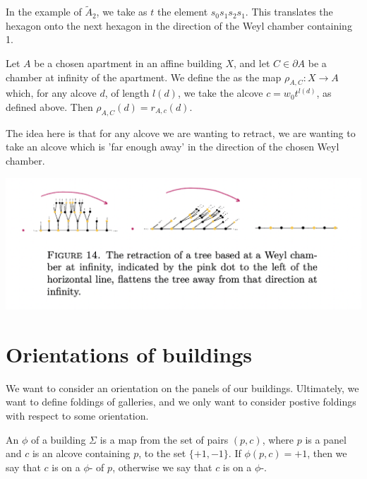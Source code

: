 \documentclass[11pt]{article}
\begin{document}
In the example of $\tilde{A}_2$, we take as $t$ the element $s_0s_1s_2s_1$. This translates the hexagon onto the next hexagon in the direction of the Weyl chamber containing 1. 

\begin{definition}
    Let $A$ be a chosen apartment in an affine building $X$, and let $C\in \partial A$ be a chamber at infinity of the apartment. We define the  as the map $\rho_{A,C}:X\longrightarrow A$ which, for any alcove $d$, of length $l(d)$, we take the alcove $c=w_0t^{l(d)}$, as defined above. Then $\rho_{A,C}(d)=r_{A,c}(d)$.
    
\end{definition}
The idea here is that for any alcove we are wanting to retract, we are wanting to take an alcove which is 'far enough away' in the direction of the chosen Weyl chamber. 

\includegraphics[scale=0.7]{Screenshot 2023-02-15 at 13.31.58.png}


\section{Orientations of buildings}

We want to consider an orientation on the panels of our buildings. Ultimately, we want to define foldings of galleries, and we only want to consider postive foldings with respect to some orientation.


\begin{definition}
    An  $\phi$ of a building $\Sigma$ is a map from the set of pairs $(p,c)$, where $p$ is a panel and $c$ is an alcove containing $p$, to the set $\{+1,-1\}$. If $\phi (p,c)=+1$, then we say that $c$ is on a $\phi$- of $p$, otherwise we say that $c$ is on a $\phi$-. 
\end{definition}
\end{document}
